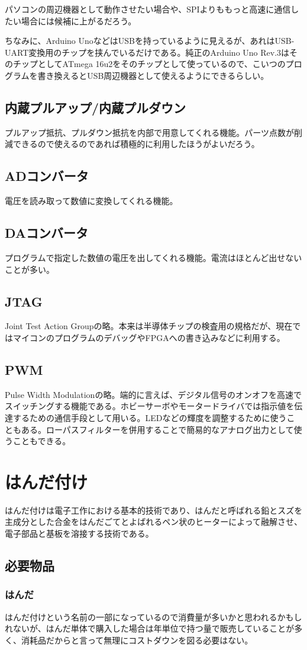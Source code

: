 \documentclass[a4paper,titlepage,here]{ujarticle}
\begin{document}
パソコンの周辺機器として動作させたい場合や、SPIよりももっと高速に通信したい場合には候補に上がるだろう。

ちなみに、Arduino UnoなどはUSBを持っているように見えるが、あれはUSB-UART変換用のチップを挟んでいるだけである。純正のArduino Uno Rev.3はそのチップとしてATmega 16u2をそのチップとして使っているので、こいつのプログラムを書き換えるとUSB周辺機器として使えるようにできるらしい。
\subsection{内蔵プルアップ/内蔵プルダウン}
プルアップ抵抗、プルダウン抵抗を内部で用意してくれる機能。パーツ点数が削減できるので使えるのであれば積極的に利用したほうがよいだろう。
\subsection{ADコンバータ}
電圧を読み取って数値に変換してくれる機能。
\subsection{DAコンバータ}
プログラムで指定した数値の電圧を出してくれる機能。電流はほとんど出せないことが多い。
\subsection{JTAG}
Joint Test Action Groupの略。本来は半導体チップの検査用の規格だが、現在ではマイコンのプログラムのデバッグやFPGAへの書き込みなどに利用する。
\subsection{PWM}
Pulse Width Modulationの略。端的に言えば、デジタル信号のオンオフを高速でスイッチングする機能である。ホビーサーボやモータードライバでは指示値を伝達するための通信手段として用いる。LEDなどの輝度を調整するために使うこともある。ローパスフィルターを併用することで簡易的なアナログ出力として使うこともできる。
\section{はんだ付け}
はんだ付けは電子工作における基本的技術であり、はんだと呼ばれる鉛とスズを主成分とした合金をはんだごてとよばれるペン状のヒーターによって融解させ、電子部品と基板を溶接する技術である。
\subsection{必要物品}
\subsubsection{はんだ}
はんだ付けという名前の一部になっているので消費量が多いかと思われるかもしれないが、はんだ単体で購入した場合は年単位で持つ量で販売していることが多く、消耗品だからと言って無理にコストダウンを図る必要はない。
\end{document}

